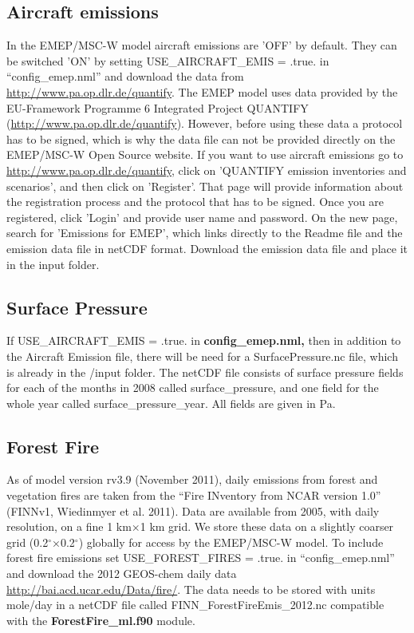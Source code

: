 \subsection{Aircraft emissions}
In the EMEP/MSC-W model aircraft emissions are 'OFF' by default. 
They can be switched 'ON' by setting USE\_AIRCRAFT\_EMIS = .true. in ``config\_emep.nml'' and download the data from \url{http://www.pa.op.dlr.de/quantify}.  
The EMEP model uses data provided by the EU-Framework Programme 6 Integrated 
Project QUANTIFY (\url{http://www.pa.op.dlr.de/quantify}). However, before using 
these data a protocol has to be signed, which is why the data file can not be provided 
directly on the EMEP/MSC-W Open Source website. If you want to use aircraft emissions go to 
\url{http://www.pa.op.dlr.de/quantify}, click on 'QUANTIFY emission inventories and scenarios', 
and then click on 'Register'. That page will provide information about the registration 
process and the protocol that has to be signed. Once you are registered, click 'Login' and 
provide user name and password. On the new page, search for 'Emissions for EMEP', which 
links directly to the Readme file and the emission data file in netCDF format. Download the 
emission data file and place it in the input folder.

\subsection{Surface Pressure}

If USE\_AIRCRAFT\_EMIS = .true. in { \bf config\_emep.nml,} then in addition to the Aircraft 
Emission file, there will be need for a SurfacePressure.nc file, which is already in the /input folder. 
The netCDF file consists of surface pressure fields for each of the months in 2008 called surface\_pressure, 
and one field for the whole year called surface\_pressure\_year. All fields are given in Pa. 

\subsection{Forest Fire}
As of model version rv3.9 (November 2011), daily emissions from forest and vegetation fires are taken from the “Fire INventory from NCAR version 1.0” (FINNv1,
Wiedinmyer et al. 2011). Data are available from 2005, with daily resolution, on a fine 1 km×1 km grid. We store these data on a slightly coarser grid (0.2$^\circ$×0.2$^\circ$) globally for access by the EMEP/MSC-W model. To include forest fire emissions set 
USE\_FOREST\_FIRES = .true. in ``config\_emep.nml'' and download the 
2012 GEOS-chem daily data \url{http://bai.acd.ucar.edu/Data/fire/}. The data needs to be stored with units mole/day in a netCDF file called FINN\_ForestFireEmis\_2012.nc 
compatible with the { \bf ForestFire\_ml.f90 } module. 

